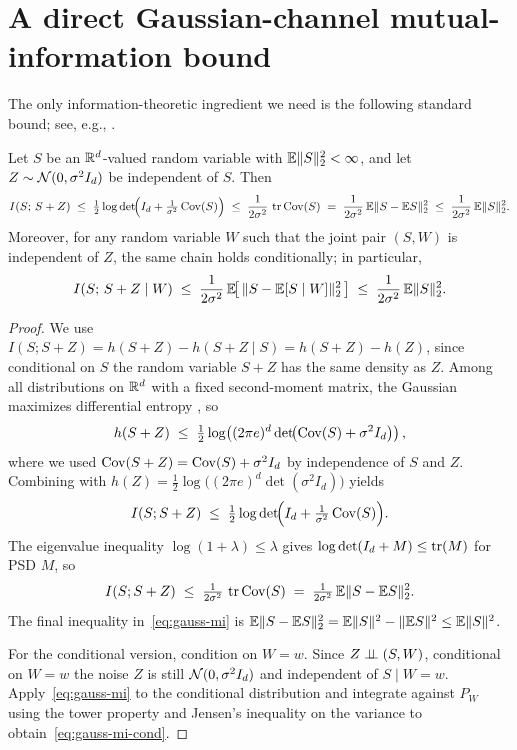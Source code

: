 \section{A direct Gaussian-channel mutual-information bound}\label{sec:lemma}

The only information-theoretic ingredient we need is the following standard bound; see, e.g., \citet[\S9]{CoverThomas2006}.

\begin{lemma}\label{lem:gauss-mi}
Let \(S\) be an \(\mathbb{R}^d\)-valued random variable with \(\mathbb{E}\|S\|_2^2<\infty\), and let \(Z\sim\mathcal{N}(0,\sigma^2 I_d)\) be independent of \(S\). Then
\begin{equation}\label{eq:gauss-mi}
I(S;\,S+Z) \;\le\; \tfrac{1}{2}\log\det\!\Bigl(I_d+\tfrac{1}{\sigma^2}\operatorname{Cov}(S)\Bigr)
\;\le\; \frac{1}{2\sigma^2}\,\operatorname{tr}\operatorname{Cov}(S) \;=\; \frac{1}{2\sigma^2}\,\mathbb{E}\|S-\mathbb{E} S\|_2^2 \;\le\; \frac{1}{2\sigma^2}\,\mathbb{E}\|S\|_2^2.
\end{equation}
Moreover, for any random variable \(W\) such that the joint pair \((S,W)\) is independent of \(Z\), the same chain holds conditionally; in particular,
\begin{equation}\label{eq:gauss-mi-cond}
I(S;\,S+Z\mid W) \;\le\; \frac{1}{2\sigma^2}\,\mathbb{E}\!\bigl[\,\|S-\mathbb{E}[S\mid W]\|_2^2\,\bigr] \;\le\; \frac{1}{2\sigma^2}\,\mathbb{E}\|S\|_2^2.
\end{equation}
\end{lemma}

\begin{proof}
We use \(I(S;S+Z) = h(S+Z) - h(S+Z\mid S) = h(S+Z) - h(Z)\), since conditional on \(S\) the random variable \(S+Z\) has the same density as \(Z\). Among all distributions on \(\mathbb{R}^d\) with a fixed second-moment matrix, the Gaussian maximizes differential entropy \citep[Theorem 8.6.5]{CoverThomas2006}, so
\[
h(S+Z)\;\le\;\tfrac{1}{2}\log\!\left((2\pi e)^d \det\!\bigl(\operatorname{Cov}(S)+\sigma^2 I_d\bigr)\right),
\]
where we used \(\operatorname{Cov}(S+Z)=\operatorname{Cov}(S)+\sigma^2 I_d\) by independence of \(S\) and \(Z\). Combining with \(h(Z)=\tfrac{1}{2}\log\!\bigl((2\pi e)^d \det(\sigma^2 I_d)\bigr)\) yields
\[
I(S;S+Z)\;\le\;\tfrac{1}{2}\log\det\!\Bigl(I_d+\tfrac{1}{\sigma^2}\operatorname{Cov}(S)\Bigr).
\]
The eigenvalue inequality \(\log(1+\lambda)\le\lambda\) gives \(\log\det(I_d+M)\le \operatorname{tr}(M)\) for PSD \(M\), so
\[
I(S;S+Z)\;\le\;\tfrac{1}{2\sigma^2}\,\operatorname{tr}\operatorname{Cov}(S)\;=\;\tfrac{1}{2\sigma^2}\,\mathbb{E}\|S-\mathbb{E} S\|_2^2.
\]
The final inequality in~\eqref{eq:gauss-mi} is \(\mathbb{E}\|S-\mathbb{E} S\|_2^2 = \mathbb{E}\|S\|^2-\|\mathbb{E} S\|^2 \le \mathbb{E}\|S\|^2\).

For the conditional version, condition on \(W=w\). Since \(Z\perp\!\!\!\perp(S,W)\), conditional on \(W=w\) the noise \(Z\) is still \(\mathcal{N}(0,\sigma^2 I_d)\) and independent of \(S\mid W=w\). Apply~\eqref{eq:gauss-mi} to the conditional distribution and integrate against \(P_W\) using the tower property and Jensen's inequality on the variance to obtain~\eqref{eq:gauss-mi-cond}.
\end{proof}

